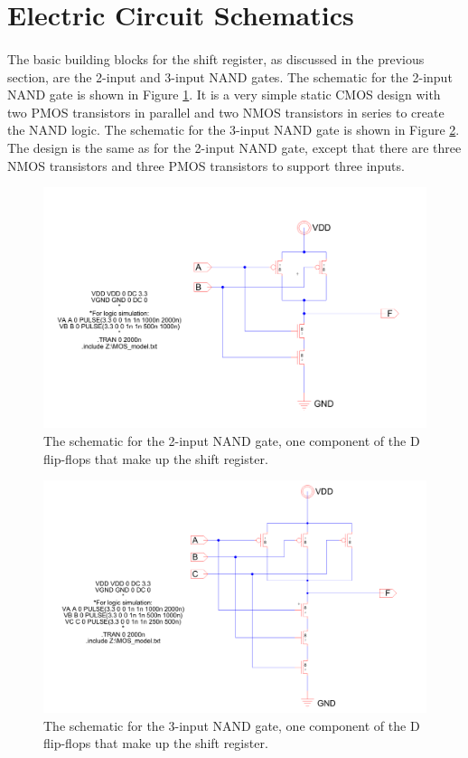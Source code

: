 \documentclass{article}
\begin{document}
\section{Electric Circuit Schematics}
  \paragraph{}
  The basic building blocks for the shift register, as discussed in the previous section, are the 2-input and 3-input NAND gates. The schematic for the 2-input NAND gate is shown in Figure \ref{fig:2-in-nand-schem}. It is a very simple static CMOS design with two PMOS transistors in parallel and two NMOS transistors in series to create the NAND logic. The schematic for the 3-input NAND gate is shown in Figure \ref{fig:3-in-nand-schem}. The design is the same as for the 2-input NAND gate, except that there are three NMOS transistors and three PMOS transistors to support three inputs.

  \begin{figure}[H]
    \centering
    \includegraphics[width=0.8\linewidth, frame]{screenshots/2-input-nand-schem.png}
    \caption{The schematic for the 2-input NAND gate, one component of the D flip-flops that make up the shift register.}
    \label{fig:2-in-nand-schem}
  \end{figure}

  \begin{figure}[H]
    \centering
    \includegraphics[width=0.8\linewidth, frame]{screenshots/3-input-nand-schem.png}
    \caption{The schematic for the 3-input NAND gate, one component of the D flip-flops that make up the shift register.}
    \label{fig:3-in-nand-schem}
  \end{figure}
\end{document}
